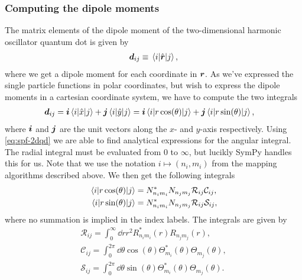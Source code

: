         \subsubsection{Computing the dipole moments}
            The matrix elements of the dipole moment of the two-dimensional
            harmonic oscillator quantum dot is given by
            \begin{align}
                \boldsymbol{d}_{ij}
                \equiv \mel{i}{\hat{\boldsymbol{r}}}{j},
            \end{align}
            where we get a dipole moment for each coordinate in $\boldsymbol{r}$. As
            we've expressed the single particle functions in polar coordinates,
            but wish to express the dipole moments in a cartesian coordinate
            system, we have to compute the two integrals
            \begin{align}
                \vf{d}_{ij}
                &= \vf{i}\mel{i}{\position}{j}
                + \vf{j}\mel{i}{\position[y]}{j}
                = \vf{i}\mel{i}{r \cos(\theta)}{j}
                + \vf{j}\mel{i}{r \sin(\theta)}{j},
                \label{eq:dipole_elements}
            \end{align}
            where $\boldsymbol{i}$ and $\boldsymbol{j}$ are the unit vectors along the $x$- and
            $y$-axis respectively.  Using \autoref{eq:spf-2dqd} we are able to
            find analytical expressions for the angular integral. The radial
            integral must be evaluated from $0$ to $\infty$, but lucikly SymPy
            \cite{sympy} handles this for us. Note that we use the notation $i
            \mapsto (n_i, m_i)$ from the mapping algorithms described above. We
            then get the following integrals
            \begin{align}
                \mel{i}{r \cos(\theta)}{j}
                &= N^{*}_{n_i m_i} N_{n_j m_j}
                \mathcal{R}_{ij}
                \mathcal{C}_{ij},
                \\
                \mel{i}{r \sin(\theta)}{j}
                &= N^{*}_{n_i m_i} N_{n_j m_j}
                \mathcal{R}_{ij}
                \mathcal{S}_{ij},
            \end{align}
            where no summation is implied in the index labels.
            The integrals are given by
            \begin{gather}
                \mathcal{R}_{ij}
                =
                \int_{0}^{\infty} \dd r r^2
                R_{n_i m_i}^{*}(r) R_{n_j m_j}(r),
                \label{eq:radial-integral-tdho}
                \\
                \mathcal{C}_{ij}
                =
                \int_{0}^{2\pi}
                \dd \theta
                \cos(\theta)
                \Theta_{m_i}^{*}(\theta)
                \Theta_{m_j}(\theta),
                \label{eq:cos-integral-tdho}
                \\
                \mathcal{S}_{ij}
                =
                \int_{0}^{2\pi}
                \dd \theta
                \sin(\theta)
                \Theta_{m_i}^{*}(\theta)
                \Theta_{m_j}(\theta).
                \label{eq:sin-integral-tdho}
            \end{gather}
